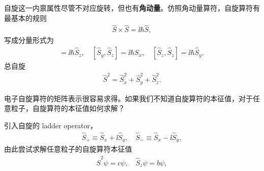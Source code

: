 
自旋这一内禀属性尽管不对应旋转，但也有\textbf{角动量}。仿照角动量算符，自旋算符有最基本的规则
\begin{align}
    \hat S \times \hat S = \ii \hbar \hat S,
\end{align}
写成分量形式为
\begin{align}
[\hat S_x, \hat S_y] = \ii\hbar \hat S_z, \quad
[\hat S_y, \hat S_z] = \ii\hbar \hat S_x, \quad
[\hat S_z, \hat S_z] = \ii\hbar \hat S_y,
\label{eq:spin_bb_2}
\end{align}
总自旋
\begin{align}
    \hat S^2 = \hat S_x^2 + \hat S_y^2 + \hat S_z^2. 
    \label{eq:spin_bb_1}
\end{align}

电子自旋算符的矩阵表示很容易求得。如果我们不知道自旋算符的本征值，对于任意粒子，自旋算符的本征值如何求解？

引入自旋的 ladder operator，
\begin{align}
    \hat S_+ \equiv \hat S_x + \ii \hat S_y, \quad \hat S_- \equiv \hat S_x - \ii \hat S_y, 
    \label{eq:spin_bb_4}
\end{align}
由此尝试求解任意粒子的自旋算符本征值
\begin{align}
    \hat S^2 \psi = c \psi, \quad \hat S_z \psi = b \psi, 
    \label{eq:spin_bb_10}
\end{align}

